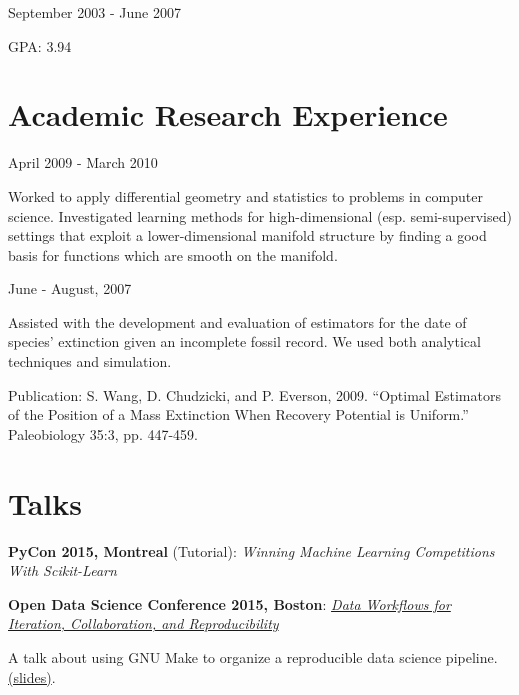 \documentclass[letterpaper]{resume}
\begin{document}
{September 2003 - June 2007}
{}
{}
\begin{compactitem}
\item GPA: 3.94 
\end{compactitem}


\section{Academic Research Experience}

{April 2009 - March 2010}
{}
{}
\begin{compactitem}
\item Worked to apply differential geometry and 
statistics to problems in computer science. Investigated learning methods for 
high-dimensional (esp. semi-supervised) settings that exploit a lower-dimensional manifold structure by finding a good 
basis for functions which are smooth on the manifold.
\end{compactitem}

{June - August, 2007}
{}
{}
\begin{compactitem}
\item Assisted with the development and evaluation of estimators for the
date of species' extinction given an incomplete fossil record. We used
both analytical techniques and simulation.

\begin{compactitem}

\item Publication: S. Wang, D. Chudzicki, and P. Everson, 2009. ``Optimal Estimators of the Position of a Mass Extinction When Recovery Potential is Uniform.'' Paleobiology 35:3, pp. 447-459. 

\end{compactitem}

\end{compactitem}

\section{Talks}

\begin{compactitem}
\item \textbf{PyCon 2015, Montreal} (Tutorial): \textit{Winning Machine Learning Competitions With Scikit-Learn}
\item \textbf{Open Data Science Conference 2015, Boston}: \textit{\href{http://opendatascicon.com/schedule/data-workflows-for-iteration-collaboration-and-reproducibility/}{Data Workflows for Iteration, Collaboration, and Reproducibility}}
\begin{compactitem}
\item A talk about using GNU Make to organize a reproducible data science pipeline. \href{http://www.davidchudzicki.com/slides/odsc-2015-workflow/}{(slides)}.
\end{compactitem}
\end{compactitem}
\end{document}
